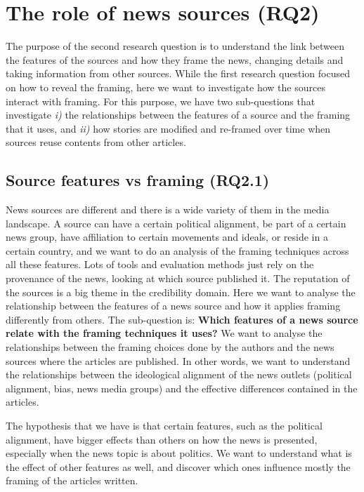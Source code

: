 \section{The role of news sources (RQ2)}
\label{sec:prop_rq2}

The purpose of the second research question is to understand the link between the features of the sources and how they frame the news, changing details and taking information from other sources.
While the first research question focused on how to reveal the framing, here we want to investigate how the sources interact with framing. For this purpose, we have two sub-questions that investigate \emph{i)} the relationships between the features of a source and the framing that it uses, and \emph{ii)} how stories are modified and re-framed over time when sources reuse contents from other articles.

\subsection{Source features vs framing (RQ2.1)}
News sources are different and there is a wide variety of them in the media landscape.
A source can have a certain political alignment, be part of a certain news group, have affiliation to certain movements and ideals, or reside in a certain country, and we want to do an analysis of the framing techniques across all these features.
Lots of tools and evaluation methods just rely on the provenance of the news, looking at which source published it. The reputation of the sources is a big theme in the credibility domain.
Here we want to analyse the relationship between the features of a news source and how it applies framing differently from others. The sub-question is:
\textbf{Which features of a news source relate with the framing techniques it uses?}
We want to analyse the relationships between the framing choices done by the authors and the news sources where the articles are published. In other words, we want to understand the relationships between the ideological alignment of the news outlets (political alignment, bias, news media groups) and the effective differences contained in the articles.



The hypothesis that we have is that certain features, such as the political alignment, have bigger effects than others on how the news is presented, especially when the news topic is about politics.
We want to understand what is the effect of other features as well, and discover which ones influence mostly the framing of the articles written.

